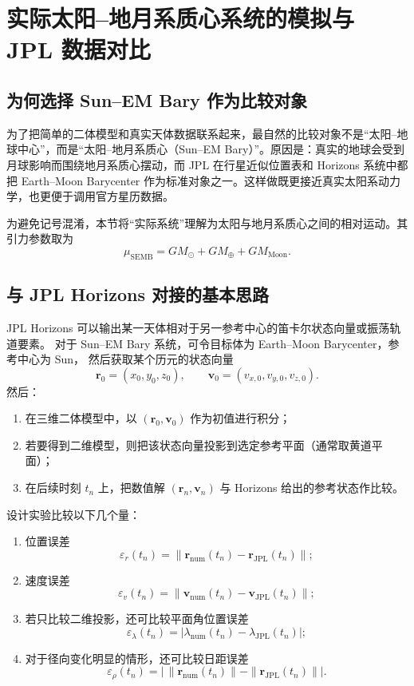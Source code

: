 \section{实际太阳--地月系质心系统的模拟与 JPL 数据对比}

\subsection{为何选择 Sun--EM Bary 作为比较对象}

为了把简单的二体模型和真实天体数据联系起来，最自然的比较对象不是“太阳--地球中心”，而是“太阳--地月系质心（Sun--EM Bary）”。原因是：真实的地球会受到月球影响而围绕地月系质心摆动，而 JPL 在行星近似位置表和 Horizons 系统中都把 Earth--Moon Barycenter 作为标准对象之一。这样做既更接近真实太阳系动力学，也更便于调用官方星历数据。

为避免记号混淆，本节将“实际系统”理解为太阳与地月系质心之间的相对运动\cite{JPLHorizonsManual,JPLApproximatePositions}。其引力参数取为
\[
\mu_{\mathrm{SEMB}}=GM_{\odot}+GM_{\oplus}+GM_{\mathrm{Moon}}.
\]

\subsection{与 JPL Horizons 对接的基本思路}

JPL Horizons 可以输出某一天体相对于另一参考中心的笛卡尔状态向量或振荡轨道要素。
对于 Sun--EM Bary 系统，可令目标体为 Earth--Moon Barycenter，参考中心为 Sun，
然后获取某个历元的状态向量\cite{JPLHorizonsManual,JPLHorizonsAPI}
\[
\bm r_0=(x_0,y_0,z_0),
\qquad
\bm v_0=(v_{x,0},v_{y,0},v_{z,0}).
\]
然后：
\begin{enumerate}[label=\arabic*.]
  \item 在三维二体模型中，以 \((\bm r_0,\bm v_0)\) 作为初值进行积分；
  \item 若要得到二维模型，则把该状态向量投影到选定参考平面（通常取黄道平面）；
  \item 在后续时刻 \(t_n\) 上，把数值解 \((\bm r_n,\bm v_n)\) 与 Horizons 给出的参考状态作比较。
\end{enumerate}

设计实验比较以下几个量：

\begin{enumerate}[label=\arabic*.]
  \item 位置误差
  \[
  \varepsilon_r(t_n)=\|\bm r_{\mathrm{num}}(t_n)-\bm r_{\mathrm{JPL}}(t_n)\|;
  \]
  \item 速度误差
  \[
  \varepsilon_v(t_n)=\|\bm v_{\mathrm{num}}(t_n)-\bm v_{\mathrm{JPL}}(t_n)\|;
  \]
  \item 若只比较二维投影，还可比较平面角位置误差
  \[
  \varepsilon_\lambda(t_n)=|\lambda_{\mathrm{num}}(t_n)-\lambda_{\mathrm{JPL}}(t_n)|;
  \]
  \item 对于径向变化明显的情形，还可比较日距误差
  \[
  \varepsilon_\rho(t_n)=\left|\,\|\bm r_{\mathrm{num}}(t_n)\|-\|\bm r_{\mathrm{JPL}}(t_n)\|\right|.
  \]
\end{enumerate}

